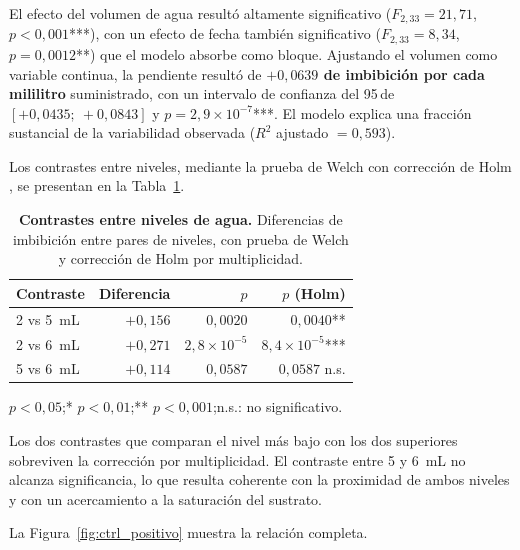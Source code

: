 El efecto del volumen de agua resultó altamente significativo (\(F_{2,33} = 21{,}71\), \(p < 0{,}001\)***), con un efecto de fecha también significativo (\(F_{2,33} = 8{,}34\), \(p = 0{,}0012\)**) que el modelo absorbe como bloque. Ajustando el volumen como variable continua, la pendiente resultó de \textbf{\(+0{,}0639\) de imbibición por cada mililitro} suministrado, con un intervalo de confianza del 95\,\pct de \([+0{,}0435;\ +0{,}0843]\) y \(p = 2{,}9 \times 10^{-7}\)***. El modelo explica una fracción sustancial de la variabilidad observada (\(R^2\) ajustado \(= 0{,}593\)).

Los contrastes entre niveles, mediante la prueba de Welch con corrección de Holm \cite{welch_1947,holm_1979}, se presentan en la Tabla~\ref{tab:ctrl_pos_contrastes}.

\begin{table}[tbp]
\small
\setlength{\tabcolsep}{3pt}
\centering
\begin{threeparttable}
\caption[Contrastes entre niveles de agua]{\textbf{Contrastes entre niveles de agua.} Diferencias de imbibición entre pares de niveles, con prueba de Welch y corrección de Holm por multiplicidad.}
\label{tab:ctrl_pos_contrastes}
\begin{tabular}{lrrr}
\toprule
Contraste & Diferencia & \(p\) & \(p\) (Holm) \\
\midrule
2 vs 5~mL & \(+0{,}156\) & \(0{,}0020\)  & \(0{,}0040\)**  \\
2 vs 6~mL & \(+0{,}271\) & \(2{,}8 \times 10^{-5}\) & \(8{,}4 \times 10^{-5}\)*** \\
5 vs 6~mL & \(+0{,}114\) & \(0{,}0587\)  & \(0{,}0587\) n.s. \\
\bottomrule
\end{tabular}
\begin{tablenotes}[flushleft]\footnotesize
  \item * \(p < 0{,}05\);\quad ** \(p < 0{,}01\);\quad *** \(p < 0{,}001\);\quad n.s.: no significativo.
\end{tablenotes}
\end{threeparttable}
\end{table}

Los dos contrastes que comparan el nivel más bajo con los dos superiores sobreviven la corrección por multiplicidad. El contraste entre 5 y 6~mL no alcanza significancia, lo que resulta coherente con la proximidad de ambos niveles y con un acercamiento a la saturación del sustrato.

La Figura~\ref{fig:ctrl_positivo} muestra la relación completa.

